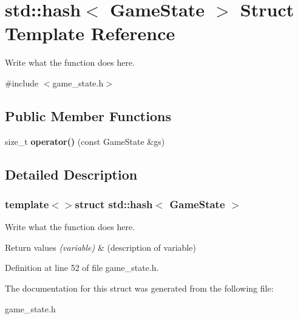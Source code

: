 \hypertarget{structstd_1_1hash_3_01GameState_01_4}{\section{std\+:\+:hash$<$ Game\+State $>$ Struct Template Reference}
\label{structstd_1_1hash_3_01GameState_01_4}
}


Write what the function does here.  




{\ttfamily \#include $<$game\+\_\+state.\+h$>$}

\subsection*{Public Member Functions}
\begin{DoxyCompactItemize}
\item 
\hypertarget{structstd_1_1hash_3_01GameState_01_4_a80bc04f6863a11c65730e753fe9ce8d4}{size\+\_\+t {\bfseries operator()} (const Game\+State \&gs)}\label{structstd_1_1hash_3_01GameState_01_4_a80bc04f6863a11c65730e753fe9ce8d4}

\end{DoxyCompactItemize}


\subsection{Detailed Description}
\subsubsection*{template$<$$>$struct std\+::hash$<$ Game\+State $>$}

Write what the function does here. 


\begin{DoxyRetVals}{Return values}
{\em (variable)} & (description of variable) \\
\hline
\end{DoxyRetVals}


Definition at line 52 of file game\+\_\+state.\+h.



The documentation for this struct was generated from the following file\+:\begin{DoxyCompactItemize}
\item 
game\+\_\+state.\+h\end{DoxyCompactItemize}
